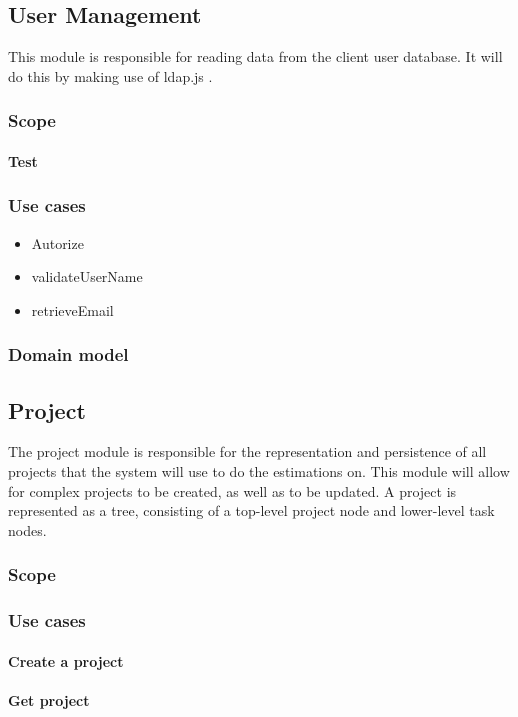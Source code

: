 \subsection{User Management}
This module is responsible for reading data from the client user database. It will do this by making use of ldap.js .
\subsubsection{Scope}
\paragraph{Test}
\subsubsection{Use cases}
\begin{itemize}
\item Autorize
\item validateUserName
\item retrieveEmail
\end{itemize}
\subsubsection{Domain model}
\subsection{Project}
The project module is responsible for the representation and persistence of all projects that the system will use to do the estimations on. This module will allow for complex projects to be created, as well as to be updated. A project is represented as a tree, consisting of a top-level project node and lower-level task nodes.
\subsubsection{Scope}

\subsubsection{Use cases}
\paragraph{Create a project}
\paragraph{Get project}

